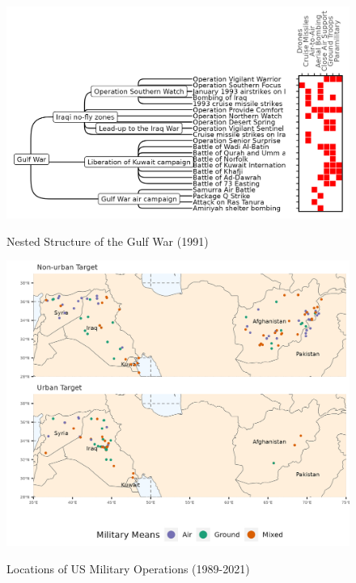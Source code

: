 \documentclass[fleqn,12pt]{article}
\begin{document}
\clearpage
{}
\newpage
\begin{figure}[h]
	\begin{center}
		\caption{Nested Structure of the Gulf War (1991)}
		{\includegraphics[width = \textwidth]{paper/figures/fig-nested-1.png}}
		\label{fig:fig-nested-1}
		\vspace{0.1 in}
	\end{center}
\end{figure}

\clearpage
{}
\newpage
\begin{figure}[h]
	\begin{center}
		\caption{Locations of US Military Operations (1989-2021)}
		{\includegraphics[width = \textwidth]{paper/figures/fig-map-1.png}}
		\label{fig:fig-map-1}
		\vspace{0.1 in}
	\end{center}
\end{figure}
\end{document}

